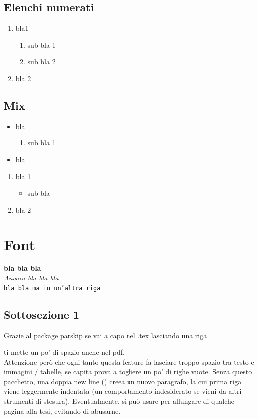 \documentclass[12pt,a4paper,twoside]{book}
\begin{document}
\subsection{Elenchi numerati}
\begin{enumerate}
    \item bla1
    \begin{enumerate}
        \item sub bla 1
        \item sub bla 2
    \end{enumerate}
    \item bla 2
\end{enumerate}

\subsection{Mix}
\begin{itemize}
    \item bla
    \begin{enumerate}
        \item sub bla 1
    \end{enumerate}
    \item bla
\end{itemize}

\begin{enumerate}
    \item bla 1
    \begin{itemize}
        \item sub bla
    \end{itemize}
    \item bla 2
\end{enumerate}

\section{Font}
\textbf{bla bla bla}\\
\textit{Ancora bla bla bla}\\
\texttt{bla bla ma in un'altra riga}

\subsection{Sottosezione 1}
Grazie al package parskip se vai a capo nel .tex lasciando una riga

ti mette un po' di spazio anche nel pdf.\\
Attenzione però che ogni tanto questa feature fa lasciare troppo spazio tra testo e immagini / tabelle, se capita prova a togliere un po' di righe vuote. Senza questo pacchetto, una doppia new line (\texttt{\n\n}) creea un nuovo paragrafo, la cui prima riga viene leggermente indentata (un comportamento indesiderato se vieni da altri strumenti di stesura). Eventualmente, si può usare per allungare di qualche pagina alla tesi, evitando di abusarne.
\end{document}
